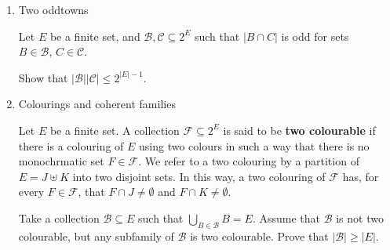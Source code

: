 \documentclass[kulak]{tplt}
\theoremstyle{definition}
\newcommand{\CC}{\mathcal C}
\newcommand{\BB}{\mathcal B}
\newcommand{\FF}{\mathcal F}
\begin{document}
\begin{enumerate}
\item Two oddtowns

Let $E$ be a finite set, and $\BB, \CC\subseteq 2^E$ such that $|B\cap C|$ is odd for sets $B\in \BB, \, C \in \CC$.

Show that $|\BB| |\CC| \leq 2^{|E|-1}$.


\item Colourings and coherent families

Let $E$ be a finite set.
A collection $\FF \subseteq 2^E $ is said to be \textbf{two colourable} if there is a colouring of $E$ using two colours in such a way that there is no monochrmatic set $F \in \FF$.
We refer to a two colouring by a partition of $E = J \uplus K$ into two disjoint sets.
In this way, a two colouring of $\FF$ has, for every $F \in \FF$, that $F\cap J \neq \emptyset $ and $ F \cap K \neq \emptyset $.

Take a collection $\BB \subseteq E$ such that $\bigcup_{B \in \BB} B = E$.
Assume that $\BB$ is not two colourable, but any subfamily of $\BB$ is two colourable.
Prove that $|\BB| \geq |E|$.



\end{enumerate}
\end{document}
